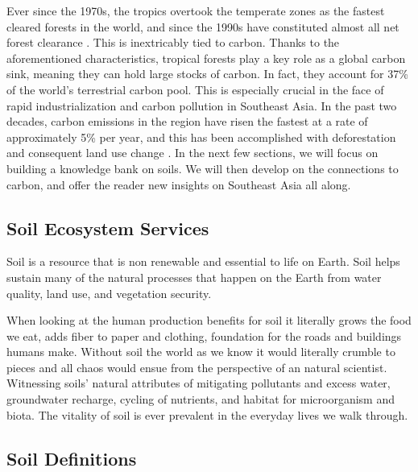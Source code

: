 Ever since the 1970s, the tropics overtook the temperate zones as the fastest cleared forests in the world, and since the 1990s have constituted almost all net forest clearance \citep{houghton1996land}. This is inextricably tied to carbon. Thanks to the aforementioned characteristics, tropical forests play a key role as a global carbon sink, meaning they can hold large stocks of carbon. In fact, they account for 37\% of the world's terrestrial carbon pool. This is especially crucial in the face of rapid industrialization and carbon pollution in Southeast Asia. In the past two decades, carbon emissions in the region have risen the fastest at a rate of approximately 5\% per year, and this has been accomplished with deforestation and consequent land use change \citep{dixon1994carbon}. In the next few sections, we will focus on building a knowledge bank on soils. We will then develop on the connections to carbon, and offer the reader new insights on Southeast Asia all along.

\subsection{Soil Ecosystem Services}

Soil is a resource that is non renewable and essential to life on Earth. Soil helps sustain many of the natural processes that happen on the Earth from water quality, land use, and vegetation security. 

When looking at the human production benefits for soil it literally grows the food we eat, adds fiber to paper and clothing, foundation for the roads and buildings humans make. Without soil the world as we know it would literally crumble to pieces and all chaos would ensue from the perspective of an natural scientist. Witnessing soils' natural attributes of mitigating pollutants and excess water, groundwater recharge, cycling of nutrients, and habitat for microorganism and biota. The vitality of soil is ever prevalent in the everyday lives we walk through.

\subsection{Soil Definitions}

